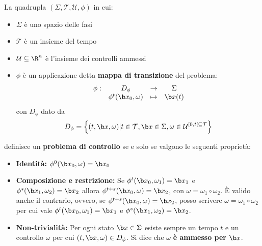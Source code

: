 \begin{definition}
    La quadrupla $\left( \Sigma, \mathcal T, \mathcal U, \phi \right)$ in cui:
    \begin{itemize}
        \item $\Sigma$ è uno spazio delle fasi
        \item $\mathcal T$ è un insieme del tempo
        \item $\mathcal U \subseteq \R^n$ è l'insieme dei controlli ammessi
        \item $\phi$ è un applicazione detta \textbf{mappa di transizione} del problema:
            \begin{equation*}
                  \begin{array}{cccc}%
                      \phi: &D_\phi &\to &\Sigma \\
                      &\phi^t(\b x_0,\omega) &\mapsto &\b x(t)
                  \end{array}%
            \end{equation*}
            con $D_\phi$ dato da
            \begin{equation*}
                D_\phi = \left\{(t, \b x, \omega) | t \in \mathcal T, \b x \in \Sigma, \omega \in \mathcal U^{[0, t[ \subseteq \mathcal T} \right\}
            \end{equation*}
    \end{itemize}
    definisce un \textbf{problema di controllo} se e solo se valgono le seguenti proprietà:
    \begin{itemize}
        \item \textbf{Identità:}
            $\phi^0(\b x_0, \omega) = \b x_0$
        \item \textbf{Composizione e restrizione:}
            Se $\phi^t(\b x_0, \omega_1) = \b x_1$ e $\phi^s(\b x_1, \omega_2) = \b x_2$
            allora $\phi^{t+s}(\b x_0, \omega) = \b x_2$, con $\omega = \omega_1 \circ \omega_2$.
            È valido anche il contrario, ovvero, se $\phi^{t+s}(\b x_0, \omega) = \b x_2$, posso
            scrivere $\omega = \omega_1 \circ \omega_2$ per cui vale $\phi^t(\b x_0, \omega_1) = \b x_1$ e $\phi^s(\b x_1, \omega_2) = \b x_2$.
        \item \textbf{Non-trivialità:}
            Per ogni stato $\b x \in \Sigma$ esiste sempre un tempo $t$ e un
            controllo $\omega$ per cui $(t, \b x, \omega) \in D_\phi$.
        Si dice che $\omega$ \textbf{è ammesso per} $\b x$.
    \end{itemize}
    \label{def:problema-di-controllo}
\end{definition}

